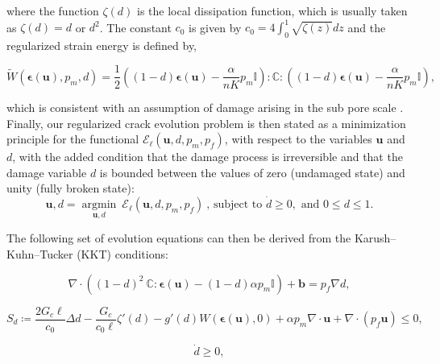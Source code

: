 where the function $\zeta(d)$ is the local dissipation function, which is usually taken as $\zeta(d) = d$ or $d^2$. The constant $c_0$ is given by $c_0 = 4\int_0^1 \sqrt{\zeta(z)}dz$ and the regularized strain energy is defined by,

\begin{equation}\label{damaged strain energy}
    \widetilde{W}(\boldsymbol{\epsilon}(\textbf{u}), p_m, d) = \dfrac{1}{2}\left( (1-d)\boldsymbol\epsilon(\textbf{u}) - \dfrac{\alpha}{nK} p_m\mathbb{I}\right) : \mathbb{C} : \left( (1-d)\boldsymbol\epsilon(\textbf{u}) - \dfrac{\alpha}{nK} p_m\mathbb{I}\right),
\end{equation}

which is consistent with an assumption of damage arising in the sub pore scale \cite{chukwudozie2019variational}. Finally, our regularized crack evolution problem is then stated as a minimization principle for the functional $\mathcal{E}_{\ell}(\textbf{u},d,p_m,p_f)$, with respect to the variables $\textbf{u}$ and $d$, with the added condition that the damage process is irreversible and that the damage variable $d$ is bounded between the values of zero (undamaged state) and unity (fully broken state):
\begin{equation}\label{variational formulation of phase-field}
    \textbf{u}, d = \underset{\textbf{u},d}{{\operatorname{argmin}}} \ \mathcal{E}_{\ell}(\textbf{u},d,p_m,p_f)\ \text{,\ \   subject to } \dot{d} \ge 0, \text{ and } 0 \le d \le 1. 
\end{equation}

The following set of evolution equations can then be derived from the Karush–Kuhn–Tucker (KKT) \cite{karush1939minima, kuhn1951nonlinear} conditions:

\begin{equation}\label{basic u problem}
    \nabla \cdot \left( (1-d)^2\ \mathbb{C}:\boldsymbol\epsilon(\textbf{u}) -(1-d)\alpha p_m \mathbb{I}\right) + \textbf{b} = p_f\nabla d, 
\end{equation}

\begin{equation}\label{damage equation}
    S_d \coloneqq  \dfrac{2G_c\ell}{c_0}\Delta d - \dfrac{G_c}{c_0\ell}\zeta'(d)-g'(d)W(\boldsymbol{\epsilon}(\boldsymbol{\textbf{u}}),0) + \alpha p_m\nabla \cdot \textbf{u} + \nabla \cdot (p_f\textbf{u}) \le 0,
\end{equation}

\begin{equation}
    \dot{d} \ge 0,
\end{equation}

